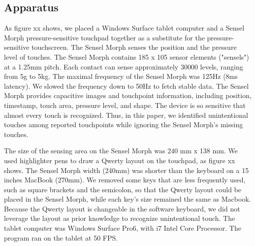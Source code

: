 \subsection{Apparatus}

As figure xx shows, we placed a Windows Surface tablet computer and a Sensel Morph pressure-sensitive touchpad \cite{Website-Morph} together as a substitute for the pressure-sensitive touchscreen. The Sensel Morph senses the position and the pressure level of touches. The Sensel Morph contains 185 x 105 sensor elements ("sensels") at a 1.25mm pitch. Each contact can sense approximately 30000 levels, ranging from 5g to 5kg. The maximal frequency of the Sensel Morph was 125Hz (8ms latency). We slowed the frequency down to 50Hz to fetch stable data. The Sensel Morph provides capacitive images and touchpoint information, including position, timestamp, touch area, pressure level, and shape. The device is so sensitive that almost every touch is recognized. Thus, in this paper, we identified unintentional touches among reported touchpoints while ignoring the Sensel Morph's missing touches.


The size of the sensing area on the Sensel Morph was 240 mm x 138 mm. We used highlighter pens to draw a Qwerty layout on the touchpad, as figure xx shows. The Sensel Morph width (240mm) was shorter than the keyboard on a 15 inches MacBook (270mm). We removed some keys that are less frequently used, such as square brackets and the semicolon, so that the Qwerty layout could be placed in the Sensel Morph, while each key's size remained the same as Macbook. Because the Qwerty layout is changeable in the software keyboard, we did not leverage the layout as prior knowledge to recognize unintentional touch. The tablet computer was Windows Surface Pro6, with i7 Intel Core Processor. The program ran on the tablet at 50 FPS.


